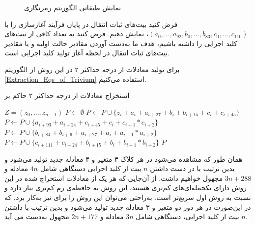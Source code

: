 \begin{enumerate}
	
	
	
\begin{figure}
\begin{center}
	
\caption{نمایش طبقاتی الگوریتم رمزنگاری
	}
\label{fig:Trivium3Stages}
\end{center}
\end{figure}
	
	فرض کنید بیت‌های ثبات انتقال در پایان فرآیند آغازسازی را با 
	$(a_{0},...,a_{92}, b_{0},...,b_{83}, c_{0},..., c_{110})$، 
	نمایش دهیم. فرض کنید به تعداد کافی از بیت‌های کلید اجرایی را داشته باشیم، هدف ما به‌دست آوردن مقادیر حالت اولیه و یا مقادیر بیت‌های ثبات انتقال در لحظه آغاز تولید کلید اجرایی است. 
	
	برای تولید معادلات از درجه حداکثر ۲ در این روش از الگوریتم 
	\ref{Extraction_Eqs_of_Trivium}
	استفاده می‌کنیم. 
	
	\begin{algorithm}
		\caption{استخراج معادلات از درجه حداکثر ۲ حاکم بر 
			}
		\label{Extraction_Eqs_of_Trivium}	
		\begin{latin}
			\begin{algorithmic}[]				
				\REQUIRE  $Z = (z_{0},...,z_{n - 1})$
				\ENSURE {}
				\STATE $P \gets \emptyset$			
				\STATE $P \gets P \cup \{z_{i} + a_{i} + a_{i + 27} + b_{i} + b_{i + 15} + c_{i} + c_{i + 45}\}$
				\STATE $P \gets P \cup \{a_{i + 93} +  a_{i + 24} + c_{i + 45} + c_{i} + c_{i + 1}*c_{i + 2}\}$
				\STATE $P \gets P \cup \{b_{i + 84} + b_{i + 6} + a_{i + 27} + a_{i} + a_{i + 1}*a_{i + 2}\}$
				\STATE $P \gets P \cup \{c_{i + 111} + c_{i + 24} + b_{i + 15} + b_{i} + b_{i + 1}*b_{i + 2}\}$		
				\ENDFOR
				\RETURN $P$
			\end{algorithmic}
		\end{latin}
	\end{algorithm}
	همان طور که مشاهده می‌شود در هر کلاک ۳ متغیر و ۴ معادله جدید تولید می‌شود و بدین ترتیب با در دست داشتن 
	$n$
	بیت از کلید اجرایی دستگاهی شامل 
	$4n$
	معادله و 
	$3n + 288$
	مجهول خواهیم داشت. از آن‌جایی که  هر یک از معادلات استخراج شده در این روش دارای یکجمله‌ای‌های کم‌تری هستند، این روش به حافظه‌ی رم کم‌تری نیاز دارد و نسبت به روش اول سریع‌تر است. به‌راحتی می‌توان این روش را برای 
	نیز به‌کار برد، که در این‌صورت در هر دور دو متغیر و ۳ معادله جدید تولید می‌شود و بدین ترتیب با داشتن 
	$n$ 
	بیت از کلید اجرایی، دستگاهی شامل 
	$3n$
	معادله و 
	$2n + 177$
	مجهول به‌دست می آید. 
\end{enumerate}
